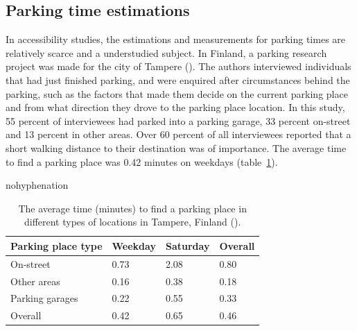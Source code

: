 \newpage
\subsection{Parking time estimations}
\justify

In accessibility studies, the estimations and measurements for parking times are relatively scarce and a understudied subject. In Finland, a parking research project was made for the city of Tampere (\cite{Kalenoja2003}). The authors interviewed individuals that had just finished parking, and were enquired after circumstances behind the parking, such as the factors that made them decide on the current parking place and from what direction they drove to the parking place location. In this study, 55 percent of interviewees had parked into a parking garage, 33 percent on-street and 13 percent in other areas. Over 60 percent of all interviewees reported that a short walking distance to their destination was of importance. The average time to find a parking place was 0.42 minutes on weekdays (table~\ref{tab:kalenoja-parktimes}).

\begin{hyphenrules}{nohyphenation}
    \begin{table}[H]
        \centering
        \caption[Parking time results in Kalenoja \& Häyrynen 2003]{The average time (minutes) to find a parking place in different types of locations in Tampere, Finland (\cite{Kalenoja2003}).} 
        \label{tab:kalenoja-parktimes}
        \begin{tabular}{ llll }
            \toprule
            Parking place type  & Weekday   & Saturday  & Overall \\
            \midrule
            On-street           & 0.73      & 2.08      & 0.80 \\
            Other areas         & 0.16      & 0.38      & 0.18 \\
            Parking garages     & 0.22      & 0.55      & 0.33 \\
            Overall             & 0.42      & 0.65      & 0.46 \\
            \bottomrule
        \end{tabular}
    \end{table}
\end{hyphenrules}

